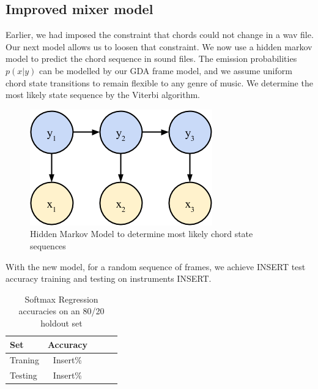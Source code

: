 \documentclass{article}
\begin{document}
\subsection{Improved mixer model}
Earlier, we had imposed the constraint that chords could not change in a wav file. Our next model allows us to loosen that constraint. We now use a hidden markov model to predict the chord sequence in sound files. The emission probabilities $p(x|y)$ can be modelled by our GDA frame model, and we assume uniform chord state transitions to remain flexible to any genre of music. We determine the most likely state sequence by the Viterbi algorithm.
\begin{figure}[ht]
\vskip 0.2in
\begin{center}
\centerline{\includegraphics[width=\columnwidth]{hmm}}
\caption{Hidden Markov Model to determine most likely chord state sequences}
\label{icml-historical}
\end{center}
\vskip -0.2in
\end{figure}

With the new model, for a random sequence of frames,  we achieve INSERT test accuracy training and testing on instruments INSERT.
\begin{table}[t]
\caption{Softmax Regression accuracies on an 80/20 holdout set}
\label{mfccvschroma}
\vskip 0.15in
\begin{center}
\begin{small}
\begin{sc}
\begin{tabular}{lcccr}
\hline
\abovespace\belowspace
Set & Accuracy \\
\hline
\abovespace
Traning    & Insert\%\\
Testing & Insert\%\\
\hline
\end{tabular}
\end{sc}
\end{small}
\end{center}
\vskip -0.1in
\end{table}
\end{document}
